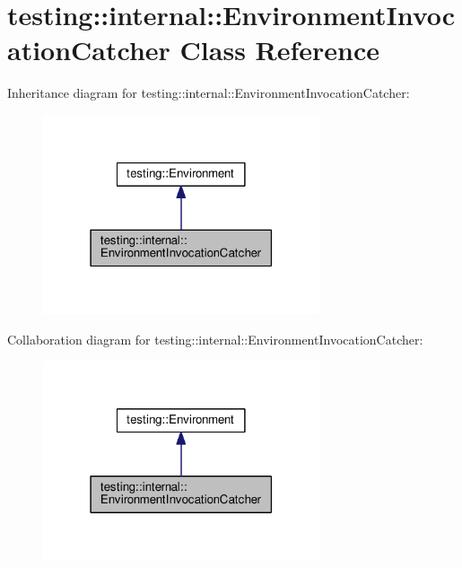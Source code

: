 \hypertarget{classtesting_1_1internal_1_1EnvironmentInvocationCatcher}{}\section{testing\+:\+:internal\+:\+:Environment\+Invocation\+Catcher Class Reference}
\label{classtesting_1_1internal_1_1EnvironmentInvocationCatcher}


Inheritance diagram for testing\+:\+:internal\+:\+:Environment\+Invocation\+Catcher\+:\nopagebreak
\begin{figure}[H]
\begin{center}
\leavevmode
\includegraphics[width=231pt]{classtesting_1_1internal_1_1EnvironmentInvocationCatcher__inherit__graph}
\end{center}
\end{figure}


Collaboration diagram for testing\+:\+:internal\+:\+:Environment\+Invocation\+Catcher\+:\nopagebreak
\begin{figure}[H]
\begin{center}
\leavevmode
\includegraphics[width=231pt]{classtesting_1_1internal_1_1EnvironmentInvocationCatcher__coll__graph}
\end{center}
\end{figure}
